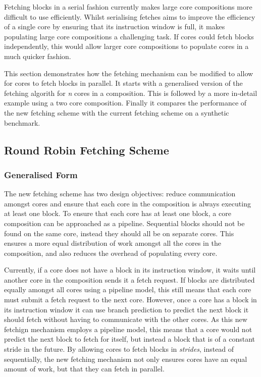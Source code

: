 Fetching blocks in a serial fashion currently makes large core compositions more difficult to use efficiently.
Whilst serialising fetches aims to improve the efficiency of a single core by ensuring that its instruction window is full, it makes populating large core compositions a challenging task.
If cores could fetch blocks independently, this would allow larger core compositions to populate cores in a much quicker fashion.

This section demonstrates how the fetching mechanism can be modified to allow for cores to fetch blocks in parallel.
It starts with a generalised version of the fetching algorith for \textit{n} cores in a composition.
This is followed by a more in-detail example using a two core composition.
Finally it compares the performance of the new fetching scheme with the current fetching scheme on a synthetic benchmark.

\subsection{Round Robin Fetching Scheme}

\subsubsection{Generalised Form}

The new fetching scheme has two design objectives: reduce communication amongst cores and ensure that each core in the composition is always executing at least one block.
To ensure that each core has at least one block, a core composition can be approached as a pipeline.
Sequential blocks should not be found on the same core, instead they should all be on separate cores.
This ensures a more equal distribution of work amongst all the cores in the composition, and also reduces the overhead of populating every core.

Currently, if a core does not have a block in its instruction window, it waits until another core in the composition sends it a fetch request.
If blocks are distributed equally amongst all cores using a pipeline model, this still means that each core must submit a fetch request to the next core.
However, once a core has a block in its instruction window it can use branch prediction to predict the next block it should fetch without having to communicate with the other cores.
As this new fetchign mechanism employs a pipeline model, this means that a core would not predict the next block to fetch for itself, but instead a block that is of a constant stride in the future. %
By allowing cores to fetch blocks in \textit{strides}, instead of sequentially, the new fetching mechanism not only ensures cores have an equal amount of work, but that they can fetch in parallel.

